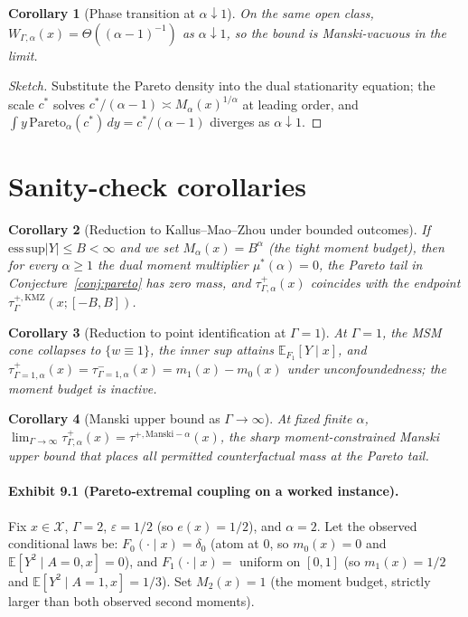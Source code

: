 \documentclass[11pt]{article}
\newcommand{\E}{\mathbb{E}}
\theoremstyle{definition}
\theoremstyle{plain}
\newtheorem{corollary}{Corollary}
\theoremstyle{remark}
\begin{document}
\begin{corollary}[Phase transition at $\alpha\downarrow 1$]\label{cor:phase}
On the same open class, $W_{\Gamma,\alpha}(x) = \Theta((\alpha-1)^{-1})$ as $\alpha\downarrow 1$, so the bound is Manski-vacuous in the limit.
\end{corollary}

\begin{proof}[Sketch]
Substitute the Pareto density into the dual stationarity equation; the scale $c^\ast$ solves $c^\ast / (\alpha-1) \asymp M_\alpha(x)^{1/\alpha}$ at leading order, and $\int y\, \mathrm{Pareto}_\alpha(c^\ast)\,dy = c^\ast/(\alpha-1)$ diverges as $\alpha\downarrow 1$.
\end{proof}

\section{Sanity-check corollaries}

\begin{corollary}[Reduction to Kallus--Mao--Zhou under bounded outcomes]\label{cor:kmz}
If $\mathrm{ess\,sup}|Y| \le B < \infty$ and we set $M_\alpha(x) = B^\alpha$ (the tight moment budget), then for every $\alpha\ge 1$ the dual moment multiplier $\mu^\ast(\alpha) = 0$, the Pareto tail in Conjecture~\ref{conj:pareto} has zero mass, and $\tau^+_{\Gamma,\alpha}(x)$ coincides with the \cite{KallusMaoZhou2019CATEIntervals} endpoint $\tau^{+,\mathrm{KMZ}}_\Gamma(x; [-B, B])$.
\end{corollary}

\begin{corollary}[Reduction to point identification at $\Gamma=1$]\label{cor:gamma1}
At $\Gamma=1$, the MSM cone collapses to $\{w\equiv 1\}$, the inner sup attains $\E_{F_1}[Y\mid x]$, and $\tau^+_{\Gamma=1,\alpha}(x) = \tau^-_{\Gamma=1,\alpha}(x) = m_1(x) - m_0(x)$ under unconfoundedness; the moment budget is inactive.
\end{corollary}

\begin{corollary}[Manski upper bound as $\Gamma\to\infty$]\label{cor:manski}
At fixed finite $\alpha$, $\lim_{\Gamma\to\infty} \tau^+_{\Gamma,\alpha}(x) = \tau^{+,\mathrm{Manski}-\alpha}(x)$, the sharp moment-constrained Manski upper bound that places all permitted counterfactual mass at the Pareto tail.
\end{corollary}

\paragraph{Exhibit 9.1 (Pareto-extremal coupling on a worked instance).}
Fix $x\in\mathcal{X}$, $\Gamma = 2$, $\varepsilon = 1/2$ (so $e(x) = 1/2$), and $\alpha = 2$. Let the observed conditional laws be: $F_0(\cdot\mid x) = \delta_{0}$ (atom at $0$, so $m_0(x) = 0$ and $\E[Y^2\mid A=0,x] = 0$), and $F_1(\cdot\mid x) = $ uniform on $[0, 1]$ (so $m_1(x) = 1/2$ and $\E[Y^2\mid A=1, x] = 1/3$). Set $M_2(x) = 1$ (the moment budget, strictly larger than both observed second moments).
\end{document}
